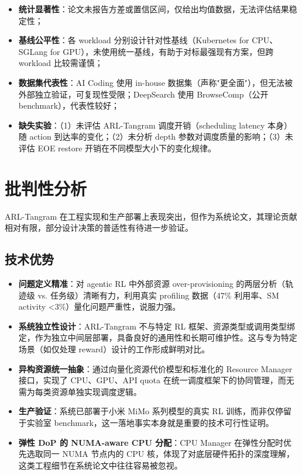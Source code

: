 \documentclass[11pt, a4paper]{article}
\newcommand{\gmark}[1]{\textcolor{StrengthGreen!80!black}{\bfseries #1}}
\begin{document}
\begin{itemize}
  \item \textbf{统计显著性}：论文未报告方差或置信区间，仅给出均值数据，无法评估结果稳定性；
  \item \textbf{基线公平性}：各 workload 分别设计针对性基线（Kubernetes for CPU、SGLang for GPU），未使用统一基线，有助于对标最强现有方案，但跨 workload 比较需谨慎；
  \item \textbf{数据集代表性}：AI Coding 使用 in-house 数据集（声称"更全面"），但无法被外部独立验证，可复现性受限；DeepSearch 使用 BrowseComp（公开 benchmark），代表性较好；
  \item \textbf{缺失实验}：（1）未评估 ARL-Tangram 调度开销（scheduling latency 本身）随 action 到达率的变化；（2）未分析 depth 参数对调度质量的影响；（3）未评估 EOE restore 开销在不同模型大小下的变化规律。
\end{itemize}

\section{批判性分析}

\begin{keyinsight}[TL;DR]
ARL-Tangram 在工程实现和生产部署上表现突出，但作为系统论文，其理论贡献相对有限，部分设计决策的普适性有待进一步验证。
\end{keyinsight}

\subsection{技术优势}

\begin{strengthbox}
\begin{itemize}
  \item \gmark{问题定义精准}：对 agentic RL 中外部资源 over-provisioning 的两层分析（轨迹级 vs. 任务级）清晰有力，利用真实 profiling 数据（47\% 利用率、SM activity <3\%）量化问题严重性，说服力强。

  \item \gmark{系统独立性设计}：ARL-Tangram 不与特定 RL 框架、资源类型或调用类型绑定，作为独立中间层部署，具备良好的通用性和长期可维护性。这与专为特定场景（如仅处理 reward）设计的工作形成鲜明对比。

  \item \gmark{异构资源统一抽象}：通过向量化资源代价模型和标准化的 Resource Manager 接口，实现了 CPU、GPU、API quota 在统一调度框架下的协同管理，而无需为每类资源单独实现调度逻辑。

  \item \gmark{生产验证}：系统已部署于小米 MiMo 系列模型的真实 RL 训练，而非仅停留于实验室 benchmark，这一落地事实本身就是重要的技术可行性证明。

  \item \gmark{弹性 DoP 的 NUMA-aware CPU 分配}：CPU Manager 在弹性分配时优先选取同一 NUMA 节点内的 CPU 核，体现了对底层硬件拓扑的深度理解，这类工程细节在系统论文中往往容易被忽视。
\end{itemize}
\end{strengthbox}
\end{document}
